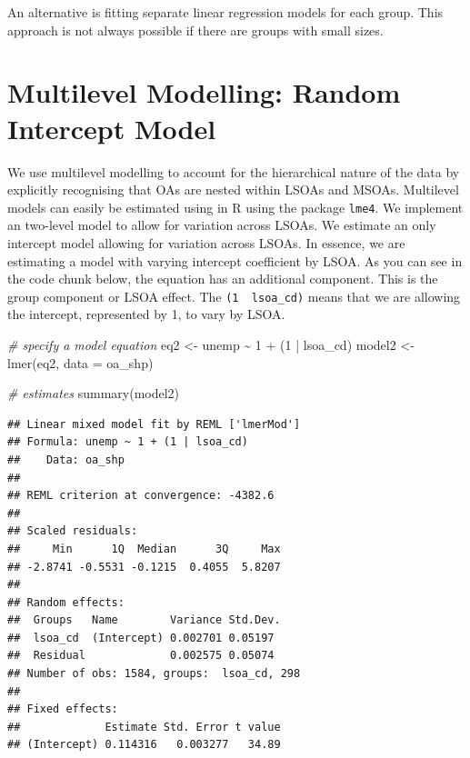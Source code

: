\documentclass[
]{book}
\newenvironment{Shaded}{\begin{snugshade}}{\end{snugshade}}
\newcommand{\AttributeTok}[1]{\textcolor[rgb]{0.77,0.63,0.00}{#1}}
\newcommand{\CommentTok}[1]{\textcolor[rgb]{0.56,0.35,0.01}{\textit{#1}}}
\newcommand{\DecValTok}[1]{\textcolor[rgb]{0.00,0.00,0.81}{#1}}
\newcommand{\FunctionTok}[1]{\textcolor[rgb]{0.00,0.00,0.00}{#1}}
\newcommand{\NormalTok}[1]{#1}
\newcommand{\OtherTok}[1]{\textcolor[rgb]{0.56,0.35,0.01}{#1}}
\newcommand{\SpecialCharTok}[1]{\textcolor[rgb]{0.00,0.00,0.00}{#1}}
\begin{document}
An alternative is fitting separate linear regression models for each group. This approach is not always possible if there are groups with small sizes.

\hypertarget{multilevel-modelling-random-intercept-model}{%
\section{Multilevel Modelling: Random Intercept Model}\label{multilevel-modelling-random-intercept-model}}

We use multilevel modelling to account for the hierarchical nature of the data by explicitly recognising that OAs are nested within LSOAs and MSOAs. Multilevel models can easily be estimated using in R using the package \texttt{lme4}. We implement an two-level model to allow for variation across LSOAs. We estimate an only intercept model allowing for variation across LSOAs. In essence, we are estimating a model with varying intercept coefficient by LSOA. As you can see in the code chunk below, the equation has an additional component. This is the group component or LSOA effect. The \texttt{(1\ \textbar{}\ lsoa\_cd)} means that we are allowing the intercept, represented by 1, to vary by LSOA.

\begin{Shaded}
\begin{Highlighting}[]
\CommentTok{\# specify a model equation}
\NormalTok{eq2 }\OtherTok{\textless{}{-}}\NormalTok{ unemp }\SpecialCharTok{\textasciitilde{}} \DecValTok{1} \SpecialCharTok{+}\NormalTok{ (}\DecValTok{1} \SpecialCharTok{|}\NormalTok{ lsoa\_cd)}
\NormalTok{model2 }\OtherTok{\textless{}{-}} \FunctionTok{lmer}\NormalTok{(eq2, }\AttributeTok{data =}\NormalTok{ oa\_shp)}

\CommentTok{\# estimates}
\FunctionTok{summary}\NormalTok{(model2)}
\end{Highlighting}
\end{Shaded}

\begin{verbatim}
## Linear mixed model fit by REML ['lmerMod']
## Formula: unemp ~ 1 + (1 | lsoa_cd)
##    Data: oa_shp
## 
## REML criterion at convergence: -4382.6
## 
## Scaled residuals: 
##     Min      1Q  Median      3Q     Max 
## -2.8741 -0.5531 -0.1215  0.4055  5.8207 
## 
## Random effects:
##  Groups   Name        Variance Std.Dev.
##  lsoa_cd  (Intercept) 0.002701 0.05197 
##  Residual             0.002575 0.05074 
## Number of obs: 1584, groups:  lsoa_cd, 298
## 
## Fixed effects:
##             Estimate Std. Error t value
## (Intercept) 0.114316   0.003277   34.89
\end{verbatim}
\end{document}
